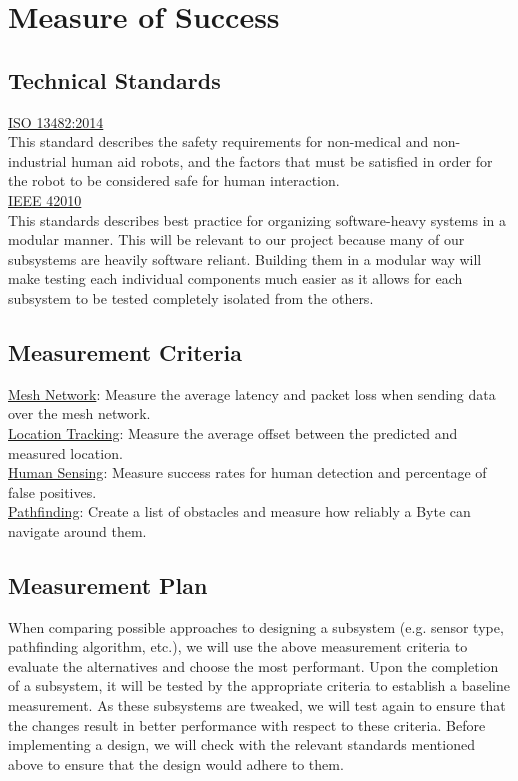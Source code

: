 \documentclass[10pt]{article}
\begin{document}
\section*{Measure of Success}
\subsection*{Technical Standards}
\underline{ISO 13482:2014}\\[0.25\baselineskip]
This standard describes the safety requirements for non-medical and non-industrial human aid robots, and the factors that must be satisfied in order for the robot to be considered safe for human interaction.\\[0.1in]
\underline{IEEE 42010}\\[0.25\baselineskip]
This standards describes best practice for organizing software-heavy systems in a modular manner. This will be relevant to our project because many of our subsystems are heavily software reliant. Building them in a modular way will make testing each individual components much easier as it allows for each subsystem to be tested completely isolated from the others.
\subsection*{Measurement Criteria}
\underline{Mesh Network}: Measure the average latency and packet loss when sending data over the mesh network.\\[0.5\baselineskip]
\underline{Location Tracking}: Measure the average offset between the predicted and measured location.\\[0.5\baselineskip]
\underline{Human Sensing}: Measure success rates for human detection and percentage of false positives.\\[0.5\baselineskip]
\underline{Pathfinding}: Create a list of obstacles and measure how reliably a Byte can navigate around them.
\subsection*{Measurement Plan}
When comparing possible approaches to designing a subsystem (e.g. sensor type, pathfinding algorithm, etc.), we will use the above measurement criteria to evaluate the alternatives and choose the most performant. Upon the completion of a subsystem, it will be tested by the appropriate criteria to establish a baseline measurement. As these subsystems are tweaked, we will test again to ensure that the changes result in better performance with respect to these criteria. Before implementing a design, we will check with the relevant standards mentioned above to ensure that the design would adhere to them.
\end{document}

